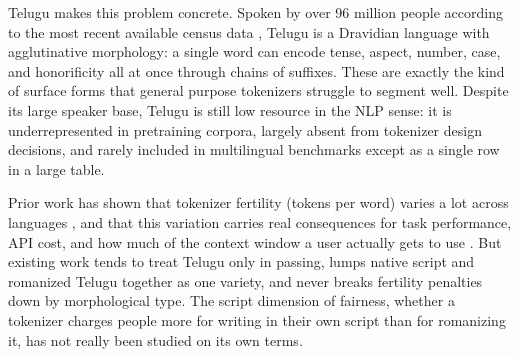 ﻿\documentclass[11pt]{article}
\begin{document}
Telugu makes this problem concrete. Spoken by over 96 million people according to the most recent
available census data \citep{census2011}, Telugu is a
Dravidian language with agglutinative morphology: a single word can
encode tense, aspect, number, case, and honorificity all at once
through chains of suffixes. These are exactly the kind of surface
forms that general purpose tokenizers struggle to segment well.
Despite its large speaker base, Telugu is still low resource in the
NLP sense: it is underrepresented in pretraining corpora, largely
absent from tokenizer design decisions, and rarely included in
multilingual benchmarks except as a single row in a large table.

Prior work has shown that tokenizer fertility (tokens per word)
varies a lot across languages \citep{rust-etal-2021-how}, and that
this variation carries real consequences for task performance, API
cost, and how much of the context window a user actually gets to use
\citep{petrov-etal-2023-language, ahia-etal-2023-languages}. But
existing work tends to treat Telugu only in passing, lumps native
script and romanized Telugu together as one variety, and never
breaks fertility penalties down by morphological type. The script
dimension of fairness, whether a tokenizer charges people more for
writing in their own script than for romanizing it, has not really
been studied on its own terms.
\end{document}
